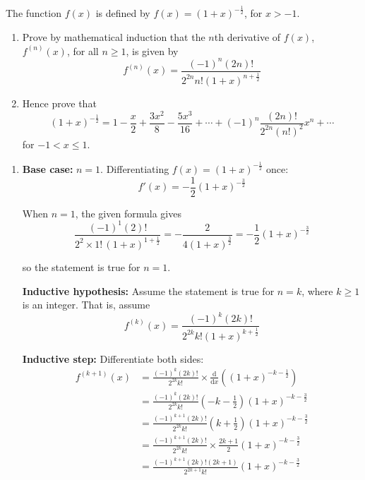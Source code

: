 \documentclass[leqno]{article}
\begin{document}
\begin{enumerate}[
  label=\textbf{\arabic*.},
  leftmargin=*,
  topsep=0pt,
  partopsep=0pt,
  parsep=0pt
]
\newpage

\questionitem

The function $f(x)$ is defined by $f(x)=(1+x)^{-\frac12}$, for $x>-1$. \\

\begin{enumerate}[label=\textbf{(\alph*)}]
  \item Prove by mathematical induction that the $n$th derivative of $f(x)$, $f^{(n)}(x)$, for all $n \ge 1$, is given by
  \[
  f^{(n)}(x)=\frac{(-1)^n(2n)!}{2^{2n}n!(1+x)^{n+\frac12}}
  \]
  \item Hence prove that
  \[
  (1+x)^{-\frac12}=1-\frac{x}{2}+\frac{3x^2}{8}-\frac{5x^3}{16}+\cdots+(-1)^n\frac{(2n)!}{2^{2n}(n!)^2}x^n+\cdots
  \]
  for $-1<x\le 1$.  \\
\end{enumerate}

\vspace*{10pt}

\begin{djsSolution}
\begin{enumerate}[label=\textbf{(\alph*)}]
  \item \textbf{Base case:} \(n=1\). Differentiating \(f(x)=(1+x)^{-\frac12}\) once:
  \[
  f'(x)=-\frac12(1+x)^{-\frac32}
  \]

  When \(n=1\), the given formula gives
  \[
  \frac{(-1)^1(2)!}{2^{2}\times 1!\,(1+x)^{1+\frac12}}
  =-\frac{2}{4(1+x)^{\frac32}}
  =-\frac12(1+x)^{-\frac32}
  \]

  so the statement is true for \(n=1\).

  \textbf{Inductive hypothesis:} Assume the statement is true for \(n=k\), where \(k\ge 1\) is an integer. That is, assume
  \[
  f^{(k)}(x)=\frac{(-1)^k(2k)!}{2^{2k}k!(1+x)^{k+\frac12}}
  \]

  \textbf{Inductive step:} Differentiate both sides:
  \begin{align*}
  f^{(k+1)}(x)
  &=\frac{(-1)^k(2k)!}{2^{2k}k!}\times \frac{\mathrm{d}}{\mathrm{d}x}\left((1+x)^{-k-\frac12}\right) \\
  &=\frac{(-1)^k(2k)!}{2^{2k}k!}\left(-k-\frac12\right)(1+x)^{-k-\frac32} \\
  &=\frac{(-1)^{k+1}(2k)!}{2^{2k}k!}\left(k+\frac12\right)(1+x)^{-k-\frac32} \\
  &=\frac{(-1)^{k+1}(2k)!}{2^{2k}k!}\times \frac{2k+1}{2}(1+x)^{-k-\frac32} \\
  &=\frac{(-1)^{k+1}(2k)!(2k+1)}{2^{2k+1}k!}(1+x)^{-k-\frac32}
  \end{align*}


\end{enumerate}
\end{djsSolution}
\end{enumerate}
\end{document}
